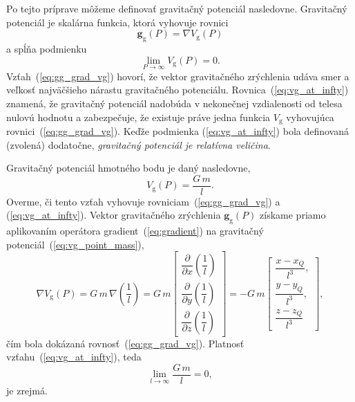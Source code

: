 \documentclass[a4paper, 12pt]{book}
\newcommand{\gidx}{\mathrm g}
\let\vec\mathbf
\begin{document}
Po tejto príprave môžeme definovať gravitačný potenciál nasledovne.  Gravitačný 
potenciál je skalárna funkcia, ktorá vyhovuje rovnici 
\citep{SansoGeoidDetermination}
%
\begin{equation}
\label{eq:gg_grad_vg}
\vec g_\gidx(P) = \nabla V_\gidx(P)
\end{equation}
%
a spĺňa podmienku
%
\begin{equation}
\label{eq:vg_at_infty}
\lim_{P \to \infty} V_\gidx(P) = 0{.}
\end{equation}
%
Vzťah~(\ref{eq:gg_grad_vg}) hovorí, že vektor gravitačného zrýchlenia udáva 
smer a veľkosť najväčšieho nárastu gravitačného potenciálu.  
Rovnica~(\ref{eq:vg_at_infty}) znamená, že gravitačný potenciál nadobúda 
v nekonečnej vzdialenosti od telesa nulovú hodnotu a zabezpečuje, že existuje 
práve jedna funkcia $V_\gidx$ vyhovujúca rovnici~(\ref{eq:gg_grad_vg}).  Keďže 
podmienka (\ref{eq:vg_at_infty}) bola definovaná (zvolená) dodatočne, 
\emph{gravitačný potenciál je relatívna veličina}.

Gravitačný potenciál hmotného bodu je daný nasledovne,
%
\begin{equation}
\label{eq:vg_point_mass}
V_\gidx(P) = \frac{G \, m}{l}{.}
\end{equation}
%
Overme, či tento vzťah vyhovuje rovniciam~(\ref{eq:gg_grad_vg}) 
a (\ref{eq:vg_at_infty}).  Vektor gravitačného zrýchlenia $\vec g_\gidx(P)$ 
získame priamo aplikovaním operátora gradient~(\ref{eq:gradient}) na gravitačný 
potenciál~(\ref{eq:vg_point_mass}),
%
\begin{equation}
\nabla V_\gidx(P) = G \, m \, \nabla \left( \frac{1}{l} \right) =
%
G \, m
\begin{bmatrix}
\dfrac{\partial}{\partial x} \left( \dfrac{1}{l} \right)\\[2ex]
\dfrac{\partial}{\partial y} \left( \dfrac{1}{l} \right)\\[2ex]
\dfrac{\partial}{\partial z} \left( \dfrac{1}{l} \right)
\end{bmatrix}
%
=
%
-G \, m
%
\begin{bmatrix}
\dfrac{x - x_Q}{l^3}{,}\\[2ex]
\dfrac{y - y_Q}{l^3}{,}\\[2ex]
\dfrac{z - z_Q}{l^3}
\end{bmatrix}
{,}
\end{equation}
%
čím bola dokázaná rovnosť~(\ref{eq:gg_grad_vg}).  Platnosť 
vzťahu~(\ref{eq:vg_at_infty}), teda
%
\begin{equation}
\lim_{l \to \infty} \frac{G \, m}{l} = 0{,}
\end{equation}
%
je zrejmá.
\end{document}
